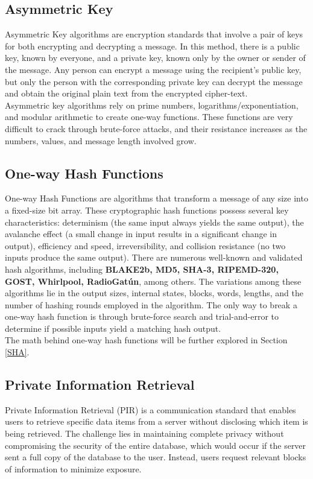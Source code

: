 \documentclass[12pt]{extarticle}
\begin{document}
\subsection{Asymmetric Key}
Asymmetric Key algorithms are encryption standards that involve a pair of keys for both encrypting and decrypting a message. In this method, there is a public key, known by everyone, and a private key, known only by the owner or sender of the message. Any person can encrypt a message using the recipient's public key, but only the person with the corresponding private key can decrypt the message and obtain the original plain text from the encrypted cipher-text.\cite{src7}\\
Asymmetric key algorithms rely on prime numbers, logarithms/exponentiation, and modular arithmetic to create one-way functions. These functions are very difficult to crack through brute-force attacks, and their resistance increases as the numbers, values, and message length involved grow.

\subsection{One-way Hash Functions}
One-way Hash Functions are algorithms that transform a message of any size into a fixed-size bit array. These cryptographic hash functions possess several key characteristics: determinism (the same input always yields the same output), the avalanche effect (a small change in input results in a significant change in output), efficiency and speed, irreversibility, and collision resistance (no two inputs produce the same output). There are numerous well-known and validated hash algorithms, including \textbf{BLAKE2b, MD5, SHA-3, RIPEMD-320, GOST, Whirlpool, RadioGatún}, among others. The variations among these algorithms lie in the output sizes, internal states, blocks, words, lengths, and the number of hashing rounds employed in the algorithm. The only way to break a one-way hash function is through brute-force search and trial-and-error to determine if possible inputs yield a matching hash output.
\cite{src5}\cite{src6}\cite{src7}\\
The math behind one-way hash functions will be further explored in Section \ref{SHA}.

\subsection{Private Information Retrieval}

Private Information Retrieval (PIR) is a communication standard that enables users to retrieve specific data items from a server without disclosing which item is being retrieved. The challenge lies in maintaining complete privacy without compromising the security of the entire database, which would occur if the server sent a full copy of the database to the user. Instead, users request relevant blocks of information to minimize exposure.
\end{document}
